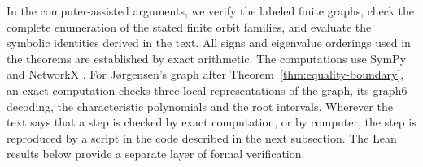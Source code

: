 \documentclass[a4paper,10pt,reqno]{amsart}
\theoremstyle{plain}
\theoremstyle{definition}
\theoremstyle{remark}
\begin{document}
In the computer-assisted arguments, we verify the labeled finite graphs,
check the complete enumeration of the stated finite orbit families, and
evaluate the symbolic identities derived in the text. All signs and eigenvalue orderings
used in the theorems are established by exact arithmetic.  The computations use
SymPy and NetworkX \cite{MeurerEtAl2017,HagbergSchultSwart2008}.
For J{\o}rgensen's graph after Theorem~\ref{thm:equality-boundary}, an exact computation
checks three local representations of the graph, its graph6 decoding, the
characteristic polynomials and the root intervals.
Wherever the text says that a step is checked by exact computation, or by
computer, the step is reproduced by a script in the code described in
the next subsection.
The Lean results below provide a separate layer of formal verification.
\end{document}
